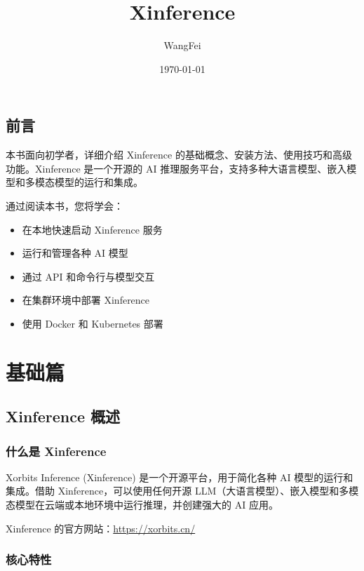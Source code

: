 \documentclass[12pt,UTF8]{ctexbook}
\title{\heiti\zihao{0} Xinference}
\author{WangFei}
\date{\today}
\begin{document}
\maketitle
\tableofcontents

\frontmatter
\chapter{前言}

本书面向初学者，详细介绍 Xinference 的基础概念、安装方法、使用技巧和高级功能。Xinference 是一个开源的 AI 推理服务平台，支持多种大语言模型、嵌入模型和多模态模型的运行和集成。

通过阅读本书，您将学会：
\begin{itemize}[leftmargin=2cm]
    \item 在本地快速启动 Xinference 服务
    \item 运行和管理各种 AI 模型
    \item 通过 API 和命令行与模型交互
    \item 在集群环境中部署 Xinference
    \item 使用 Docker 和 Kubernetes 部署
\end{itemize}

\mainmatter

\part{基础篇}

\chapter{Xinference 概述}
\label{chap:overview}

\section{什么是 Xinference}
\label{sec:what_is_xinference}

Xorbits Inference (Xinference) 是一个开源平台，用于简化各种 AI 模型的运行和集成。借助 Xinference，可以使用任何开源 LLM（大语言模型）、嵌入模型和多模态模型在云端或本地环境中运行推理，并创建强大的 AI 应用。

Xinference 的官方网站：\url{https://xorbits.cn/}

\section{核心特性}
\label{sec:features}
\end{document}
